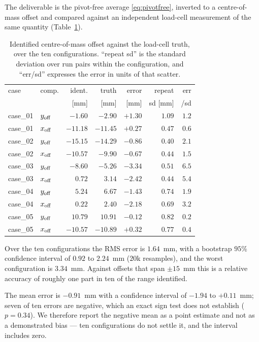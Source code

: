 The deliverable is the pivot-free average \eqref{eq:pivotfree},
inverted to a centre-of-mass offset and compared against an
independent load-cell measurement of the same quantity
(Table~\ref{tab:offset}).

\begin{table}[t]
\centering
\caption{Identified centre-of-mass offset against the load-cell truth,
over the ten configurations. ``repeat sd'' is the standard deviation
over run pairs within the configuration, and ``err/sd'' expresses the
error in units of that scatter.}
\label{tab:offset}
\small
\setlength{\tabcolsep}{4pt}
\begin{tabular}{@{}ll rrr rr@{}}
\hline
case & comp. & ident. & truth & error & repeat & err \\
 & & [mm] & [mm] & [mm] & sd [mm] & /sd \\
\hline
case\_01 & $y_{\rm off}$ & $-1.60$  & $-2.90$  & $+1.30$ & $1.09$ & $1.2$\\
case\_01 & $x_{\rm off}$ & $-11.18$ & $-11.45$ & $+0.27$ & $0.47$ & $0.6$\\
case\_02 & $y_{\rm off}$ & $-15.15$ & $-14.29$ & $-0.86$ & $0.40$ & $2.1$\\
case\_02 & $x_{\rm off}$ & $-10.57$ & $-9.90$  & $-0.67$ & $0.44$ & $1.5$\\
case\_03 & $y_{\rm off}$ & $-8.60$  & $-5.26$  & $-3.34$ & $0.51$ & $6.5$\\
case\_03 & $x_{\rm off}$ & $0.72$   & $3.14$   & $-2.42$ & $0.44$ & $5.4$\\
case\_04 & $y_{\rm off}$ & $5.24$   & $6.67$   & $-1.43$ & $0.74$ & $1.9$\\
case\_04 & $x_{\rm off}$ & $0.22$   & $2.40$   & $-2.18$ & $0.69$ & $3.2$\\
case\_05 & $y_{\rm off}$ & $10.79$  & $10.91$  & $-0.12$ & $0.82$ & $0.2$\\
case\_05 & $x_{\rm off}$ & $-10.57$ & $-10.89$ & $+0.32$ & $0.77$ & $0.4$\\
\hline
\end{tabular}
\end{table}

Over the ten configurations the RMS error is $1.64$~mm, with a
bootstrap $95\%$ confidence interval of $0.92$ to $2.24$~mm ($20$k
resamples), and the worst configuration is $3.34$~mm. Against offsets
that span $\pm15$~mm this is a relative accuracy of roughly one part
in ten of the range identified.

The mean error is $-0.91$~mm with a confidence interval of $-1.94$ to
$+0.11$~mm; seven of ten errors are negative, which an exact sign test
does not establish ($p = 0.34$). We therefore report the negative mean
as a point estimate and not as a demonstrated bias --- ten
configurations do not settle it, and the interval includes zero.

